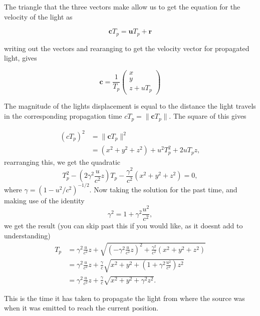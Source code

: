 \begin{derivation}

The triangle that the three vectors make allow us to get the equation for the velocity of the light as

\begin{equation}
	\mathbf{c} T_{p} = \mathbf{u} T_{p} + \mathbf{r}
\end{equation}

writing out the vectors and rearanging to get the velocity vector for propagated light, gives

\begin{equation}
	\mathbf{c} = \frac{1}{ T_{p}}
	\begin{pmatrix}
		x \\
		y \\
		z + u T_{p}
	\end{pmatrix}
\end{equation}

The magnitude of the lights displacement is equal to the distance the light travels in the corresponding propagation time $ c T_{p} = \|\mathbf{c} T_{p}\|$. The square of this gives

\begin{equation}
	\begin{split}
		\left( c T_{p}\right)^2 & = \|\mathbf{c} T_{p}\|^2                           \\
		                          & = (x^2 + y^2 + z^2) + u^2 T_{p}^2 + 2u T_{p} z,
	\end{split}
\end{equation}
rearranging this, we get the quadratic
\begin{equation}
	T_{p}^{2} - \left(2\gamma^2\frac{u}{c^2} z\right)T_{p} - \frac{\gamma^2}{c^2}(x^2+y^2+z^2) = 0,
\end{equation}
where $\gamma = (1 - u^2/c^2)^{-1/2}$. Now taking the solution for the past time, and making use of the identity
\begin{equation}
	\gamma^2 = 1+\gamma^2\frac{u^2}{c^2},
\end{equation}
we get the result (you can skip past this if you would like, as it doesnt add to understanding)
\begin{equation}
	\begin{split}
		T_{p} & = \gamma^2\frac{u}{c^2}z + \sqrt{\left(-\gamma^2\frac{u}{c^2} z\right)^2+\frac{\gamma^2}{c^2}(x^2+y^2+z^2)} \\
		      & = \gamma^2\frac{u}{c^2}z + \frac{\gamma}{c}\sqrt{x^2+y^2+\left(1+\gamma^2\frac{u^2}{c^2}\right) z^2}        \\
		      & = \gamma^2\frac{u}{c^2}z + \frac{\gamma}{c}\sqrt{x^2+y^2+\gamma^2 z^2}.
	\end{split}
\end{equation}

This is the time it has taken to propagate the light from where the source was when it was emitted to reach the current position.

\end{derivation}
